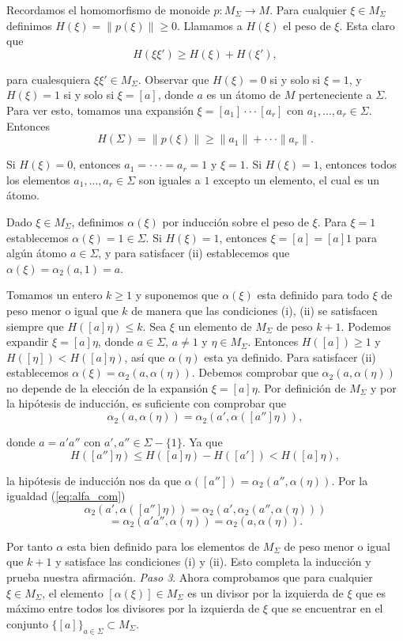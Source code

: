 \documentclass[12pt]{article}
\theoremstyle{definition}
\providecommand{\norm}[1]{\lVert#1\rVert}
\begin{document}
Recordamos el homomorfismo de monoide $p:M_\Sigma\rightarrow M$. Para cualquier $\xi\in M_\Sigma$ definimos $H(\xi)=\norm{p(\xi)}\geq 0$. Llamamos a $H(\xi)$ el peso de $\xi$. Esta claro que
$$H(\xi\xi')\geq H(\xi)+H(\xi'),$$


para cualesquiera $\xi\xi'\in M_\Sigma$. Observar que $H(\xi)=0$ si y solo si $\xi=1$, y $H(\xi)=1$ si y solo si $\xi=[a]$, donde $a$ es un átomo de $M$ perteneciente a $\Sigma$. Para ver esto, tomamos una expansión $\xi=[a_1]\cdot\cdot\cdot[a_r]$ con $a_1,...,a_r\in\Sigma$. Entonces
$$H(\Sigma)=\norm{p(\xi)}\geq\norm{a_1}+\cdot\cdot\cdot\norm{a_r}.$$

Si $H(\xi)=0$, entonces $a_1=\cdot\cdot\cdot=a_r=1$ y $\xi=1$. Si $H(\xi)=1$, entonces todos los elementos $a_1,...,a_r\in\Sigma$ son iguales a $1$ excepto un elemento, el cual es un átomo.

Dado $\xi\in M_\Sigma$, definimos $\alpha(\xi)$ por inducción sobre el peso de $\xi$. Para $\xi=1$ establecemos $\alpha(\xi)=1\in\Sigma$. Si $H(\xi)=1$, entonces $\xi=[a]=[a]1$ para algún átomo $a\in\Sigma$, y para satisfacer (ii) establecemos que $\alpha(\xi)=\alpha_2(a,1)=a$.

Tomamos un entero $k\geq 1$ y suponemos que $\alpha(\xi)$ esta definido para todo $\xi$ de peso menor o igual que $k$ de manera que las condiciones (i), (ii) se satisfacen siempre que $H([a]\eta)\leq k$. Sea $\xi$ un elemento de $M_\Sigma$ de peso $k+1$. Podemos expandir $\xi=[a]\eta$, donde $a\in\Sigma$, $a\neq 1$ y $\eta\in M_\Sigma$. Entonces $H([a])\geq 1$ y $H([\eta]) < H([a]\eta)$, así que $\alpha(\eta)$ esta ya definido. Para satisfacer (ii) establecemos $\alpha(\xi)=\alpha_2(a,\alpha(\eta))$. Debemos comprobar que $\alpha_2(a,\alpha(\eta))$ no depende de la elección de la expansión $\xi=[a]\eta$. Por definición de $M_\Sigma$ y por la hipótesis de inducción, es suficiente con comprobar que 
$$\alpha_2(a,\alpha(\eta))=\alpha_2(a',\alpha([a'']\eta)),$$

donde $a=a'a''$ con $a',a''\in \Sigma -\{1\}$. Ya que
$$H([a'']\eta)\leq H([a]\eta) - H([a'])<H([a]\eta),$$


la hipótesis de inducción nos da que $\alpha([a''])=\alpha_2(a'',\alpha(\eta))$. Por la igualdad (\ref{eq:alfa_com}) 
$$\alpha_2(a',\alpha([a'']\eta))=\alpha_2(a',\alpha_2(a'',\alpha(\eta)))$$
$$=\alpha_2(a'a'',\alpha(\eta))=\alpha_2(a,\alpha(\eta)).$$

Por tanto $\alpha$ esta bien definido para los elementos de $M_\Sigma$ de peso menor o igual que $k +1$ y satisface las condiciones (i) y (ii). Esto completa la inducción y prueba nuestra afirmación.
\newline
\newline
\textit{Paso 3}. Ahora comprobamos que para cualquier $\xi\in M_\Sigma$, el elemento $[\alpha(\xi)]\in M_\Sigma$ es un divisor por la izquierda de $\xi$ que es máximo entre todos los divisores por la izquierda de $\xi$ que se encuentrar en el conjunto $\{[a]\}_{a\in\Sigma}\subset M_\Sigma$.
\end{document}
